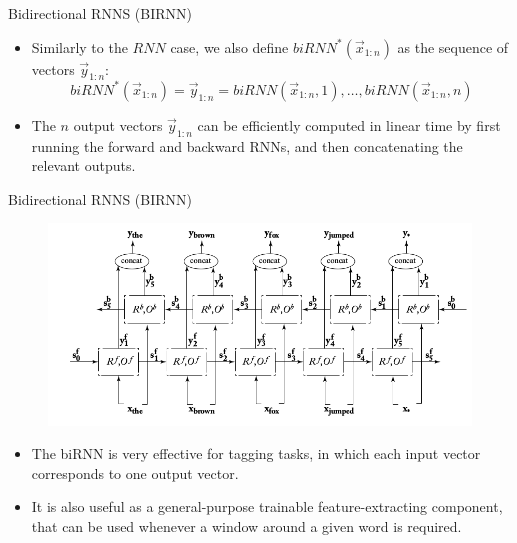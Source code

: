 \documentclass[handout]{beamer}
\begin{document}
\begin{frame}{Bidirectional RNNS (BIRNN)}
\begin{scriptsize}
\begin{itemize}
\item Similarly to the $RNN$ case, we also define $biRNN^{*}(\vec{x}_{1:n})$ as the sequence of vectors $\vec{y}_{1:n}$:    
\begin{displaymath}
biRNN^{*}(\vec{x}_{1:n})= \vec{y}_{1:n} = biRNN(\vec{x}_{1:n},1),\dots,biRNN(\vec{x}_{1:n},n)
\end{displaymath}
\item The $n$ output vectors $\vec{y}_{1:n}$ can be efficiently computed in linear time by first running the forward and backward RNNs, and then concatenating the relevant outputs.
\end{itemize}
\end{scriptsize}
\end{frame}


\begin{frame}{Bidirectional RNNS (BIRNN)}
\begin{scriptsize}

  \begin{figure}[h]
        	\includegraphics[scale = 0.35]{pics/biRNNstar.png}
        \end{figure}


\begin{itemize}

\item The biRNN is very effective for tagging tasks, in which each input vector corresponds to one output vector.

\item It is also useful as a general-purpose trainable feature-extracting component, that can be used whenever a window around a given word is required.
\end{itemize}
\end{scriptsize}
\end{frame}
\end{document}
